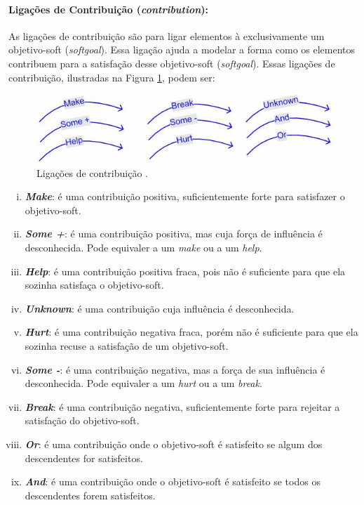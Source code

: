                 \paragraph{Ligações de Contribuição (\emph{contribution}):}
                    As ligações de contribuição são para ligar elementos à exclusivamente um objetivo-soft (\emph{softgoal}).
                    Essa ligação ajuda a modelar a forma como os elementos contribuem para a satisfação desse objetivo-soft (\emph{softgoal}).
                    Essas ligações de contribuição, ilustradas na Figura \ref{fig:contributions}, podem ser:
                    \begin{figure}[h!]
                        \centering
                            \includegraphics[scale=1]{Figuras/istar/contributions.jpg}
                            \caption{Ligações de contribuição \cite{site2013iwiki}.}
                            \label{fig:contributions}
                    \end{figure}
                    \begin{enumerate}[i.]
                        \item \textbf{\emph{Make}}: é uma contribuição positiva, suficientemente forte para satisfazer o objetivo-soft. 
                        \item \textbf{\emph{Some +}}: é uma contribuição positiva, mas cuja força de influência é desconhecida. Pode equivaler a um \emph{make} ou a um \emph{help}.
                        \item \textbf{\emph{Help}}: é uma contribuição positiva fraca, pois não é suficiente para que ela sozinha satisfaça o objetivo-soft.
                        \item \textbf{\emph{Unknown}}: é uma contribuição cuja influência é desconhecida. 
                        \item \textbf{\emph{Hurt}}: é uma contribuição negativa fraca, porém não é suficiente para que ela sozinha recuse a  satisfação de um objetivo-soft.
                        \item \textbf{\emph{Some -}}: é uma contribuição negativa, mas a força de sua influência é desconhecida. Pode equivaler a um \emph{hurt} ou a um \emph{break}.
                        \item \textbf{\emph{Break}}: é uma contribuição negativa, suficientemente forte para rejeitar a satisfação do objetivo-soft.
                        \item \textbf{\emph{Or}}: é uma contribuição onde o objetivo-soft é satisfeito se algum dos descendentes for satisfeitos. 
                        \item \textbf{\emph{And}}: é uma contribuição onde o objetivo-soft é satisfeito se todos os descendentes forem satisfeitos.
                    \end{enumerate}
                
